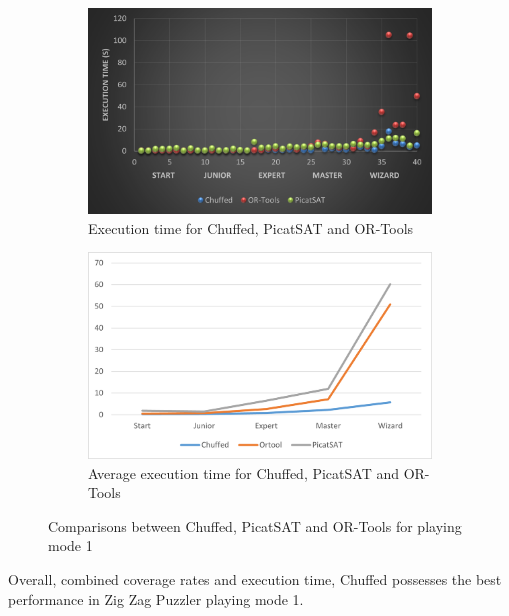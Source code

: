 \begin{figure}[htbp]
    \centering
    \begin{subfigure}[b]{0.48\textwidth}
     \includegraphics[width=\textwidth]{figs/time1three.png}
    \caption{Execution time for Chuffed, PicatSAT and OR-Tools}
    \label{fig:time1three}
    \end{subfigure}
    \begin{subfigure}[b]{0.48\textwidth}
     \includegraphics[width=\textwidth]{figs/mode1solverscomparison.png}
    \caption{Average execution time for Chuffed, PicatSAT and OR-Tools}
    \label{fig:time1threeslope}
    \end{subfigure}
    \caption{Comparisons between Chuffed, PicatSAT and OR-Tools for playing mode 1}
\end{figure}
Overall, combined coverage rates and execution time, Chuffed possesses the best performance in Zig Zag Puzzler playing mode 1.
